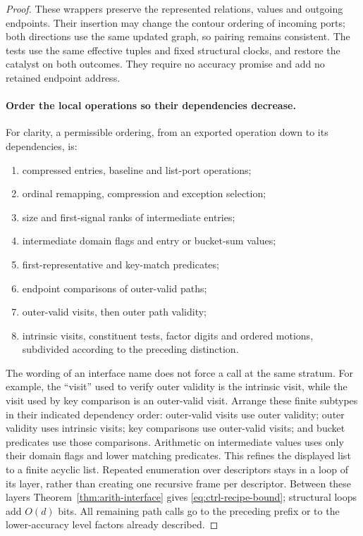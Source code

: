 \documentclass[11pt]{article}
\numberwithin{equation}{section}
\theoremstyle{definition}
\theoremstyle{remark}
\begin{document}
\begin{proof}
These wrappers preserve the represented relations, values and outgoing
endpoints. Their insertion may change the contour ordering of incoming
ports; both directions use the same updated graph, so pairing remains
consistent. The tests use the same effective tuples and fixed structural
clocks, and restore the catalyst on both outcomes. They require no
accuracy promise and add no retained endpoint address.

\paragraph{Order the local operations so their dependencies decrease.}
For clarity, a permissible ordering, from an exported operation down
to its dependencies, is:
\begin{enumerate}
\item compressed entries, baseline and list-port operations;
\item ordinal remapping, compression and exception selection;
\item size and first-signal ranks of intermediate entries;
\item intermediate domain flags and entry or bucket-sum values;
\item first-representative and key-match predicates;
\item endpoint comparisons of outer-valid paths;
\item outer-valid visits, then outer path validity;
\item intrinsic visits, constituent tests, factor digits and ordered
  motions, subdivided according to the preceding distinction.
\end{enumerate}
The wording of an interface name does not force a call at the same
stratum.  For example, the ``visit'' used to verify outer validity is
the intrinsic visit, while the visit used by key comparison is an
outer-valid visit.  Arrange these finite subtypes in their indicated
dependency order: outer-valid visits use outer validity; outer validity
uses intrinsic visits; key comparisons use outer-valid visits; and
bucket predicates use those comparisons.  Arithmetic on intermediate
values uses only their domain flags and lower matching predicates.
This refines the displayed list to a finite acyclic list.  Repeated
enumeration over descriptors stays in a loop of its layer, rather than
creating one recursive frame per descriptor.  Between these layers
Theorem~\ref{thm:arith-interface} gives \eqref{eq:ctrl-recipe-bound};
structural loops add $O(d)$ bits.  All remaining path calls go to the
preceding prefix or to the lower-accuracy level factors already described.


\end{proof}
\end{document}
